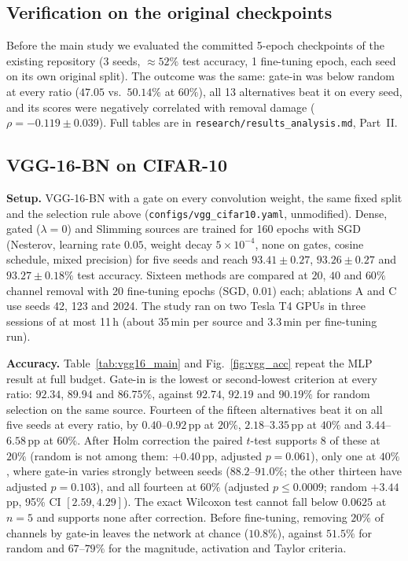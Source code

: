 \subsection{Verification on the original checkpoints}\label{sec:legacy}
Before the main study we evaluated the committed 5-epoch checkpoints of the existing
repository (3 seeds, $\approx52\%$ test accuracy, 1 fine-tuning epoch, each seed on its
own original split). The outcome was the same: gate-in was below random at every ratio
($47.05$ vs.\ $50.14\%$ at $60\%$), all 13 alternatives beat it on every seed, and its
scores were negatively correlated with removal damage ($\rho=-0.119\pm0.039$). Full tables
are in \texttt{research/results\_analysis.md}, Part~II.

\subsection{VGG-16-BN on CIFAR-10}\label{sec:vgg}
\textbf{Setup.} VGG-16-BN with a gate on every convolution weight, the same fixed split
and the selection rule above (\texttt{configs/vgg\_cifar10.yaml}, unmodified). Dense, gated
($\lambda=0$) and Slimming sources are trained for 160 epochs with SGD (Nesterov, learning
rate $0.05$, weight decay $5\times10^{-4}$, none on gates, cosine schedule, mixed
precision) for five seeds and reach $93.41\pm0.27$, $93.26\pm0.27$ and $93.27\pm0.18\%$
test accuracy. Sixteen methods are compared at $20$, $40$ and $60\%$ channel removal with
20 fine-tuning epochs (SGD, $0.01$) each; ablations A and C use seeds 42, 123 and 2024.
The study ran on two Tesla T4 GPUs in three sessions of at most 11\,h (about 35\,min per
source and 3.3\,min per fine-tuning run).

\textbf{Accuracy.} Table~\ref{tab:vgg16_main} and Fig.~\ref{fig:vgg_acc} repeat the MLP
result at full budget. Gate-in is the lowest or second-lowest criterion at every ratio:
$92.34$, $89.94$ and $86.75\%$, against $92.74$, $92.19$ and $90.19\%$ for random
selection on the same source. Fourteen of the fifteen alternatives beat it on all five
seeds at every ratio, by $0.40$--$0.92$\,pp at $20\%$, $2.18$--$3.35$\,pp at $40\%$ and
$3.44$--$6.58$\,pp at $60\%$. After Holm correction the paired $t$-test supports 8 of
these at $20\%$ (random is not among them: $+0.40$\,pp, adjusted $p=0.061$), only one at
$40\%$, where gate-in varies strongly between seeds ($88.2$--$91.0\%$; the other thirteen
have adjusted $p=0.103$), and all fourteen at $60\%$ (adjusted $p\le0.0009$; random
$+3.44$\,pp, 95\% CI $[2.59,4.29]$). The exact Wilcoxon test cannot fall below $0.0625$ at
$n=5$ and supports none after correction. Before fine-tuning, removing $20\%$ of channels
by gate-in leaves the network at chance ($10.8\%$), against $51.5\%$ for random and
$67$--$79\%$ for the magnitude, activation and Taylor criteria.

